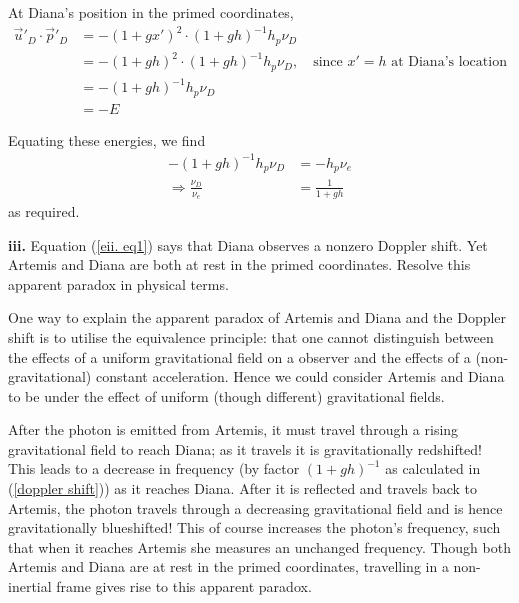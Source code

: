 \documentclass[a4paper]{article} %
\begin{document}
At Diana's position in the primed coordinates,
\begin{align}
\vec{u}'_D \cdot \vec{p}'_D &=-(1+gx')^2\cdot(1+gh)^{-1} h_p\nu_D\\
&=-(1+gh)^2\cdot(1+gh)^{-1} h_p\nu_D, \quad\text{since $x'=h$ at Diana's location}\\
&=-(1+gh)^{-1} h_p\nu_D\\
&=-E
\end{align}

Equating these energies, we find
\begin{align}
-(1+gh)^{-1} h_p\nu_D&=-h_p\nu_e\\
\Rightarrow \frac{\nu_D}{\nu_e}&=\frac{1}{1+gh}\label{doppler shift}
\end{align}
as required.



\begin{framed}
\textbf{iii.} Equation (\ref{eii. eq1}) says that Diana observes a nonzero Doppler shift. Yet Artemis and Diana are both at rest in the primed coordinates. Resolve this apparent paradox in physical terms.
\end{framed}

One way to explain the apparent paradox of Artemis and Diana and the Doppler shift is to utilise the equivalence principle: that one cannot distinguish between the effects of a uniform gravitational field on a observer and the effects of a (non-gravitational) constant acceleration. Hence we could consider Artemis and Diana to be under the effect of uniform (though different) gravitational fields.

After the photon is emitted from Artemis, it must travel through a rising gravitational field to reach Diana; as it travels it is gravitationally redshifted! This leads to a decrease in frequency (by factor $(1+gh)^{-1}$ as calculated in (\ref{doppler shift})) as it reaches Diana. After it is reflected and travels back to Artemis, the photon travels through a decreasing gravitational field and is hence gravitationally blueshifted! This of course increases the photon's frequency, such that when it reaches Artemis she measures an unchanged frequency. Though both Artemis and Diana are at rest in the primed coordinates, travelling in a non-inertial frame gives rise to this apparent paradox.
\end{document}
